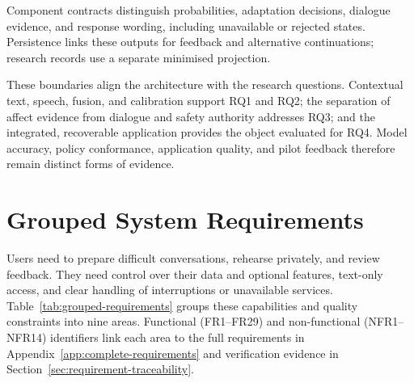Component contracts distinguish probabilities, adaptation decisions, dialogue evidence, and response wording, including unavailable or rejected states. Persistence links these outputs for feedback and alternative continuations; research records use a separate minimised projection.

These boundaries align the architecture with the research questions. Contextual text, speech, fusion, and calibration support RQ1 and RQ2; the separation of affect evidence from dialogue and safety authority addresses RQ3; and the integrated, recoverable application provides the object evaluated for RQ4. Model accuracy, policy conformance, application quality, and pilot feedback therefore remain distinct forms of evidence.

\section{Grouped System Requirements}
\label{sec:system-requirements-scope}

Users need to prepare difficult conversations, rehearse privately, and review feedback. They need control over their data and optional features, text-only access, and clear handling of interruptions or unavailable services. Table~\ref{tab:grouped-requirements} groups these capabilities and quality constraints into nine areas. Functional (FR1--FR29) and non-functional (NFR1--NFR14) identifiers link each area to the full requirements in Appendix~\ref{app:complete-requirements} and verification evidence in Section~\ref{sec:requirement-traceability}.

